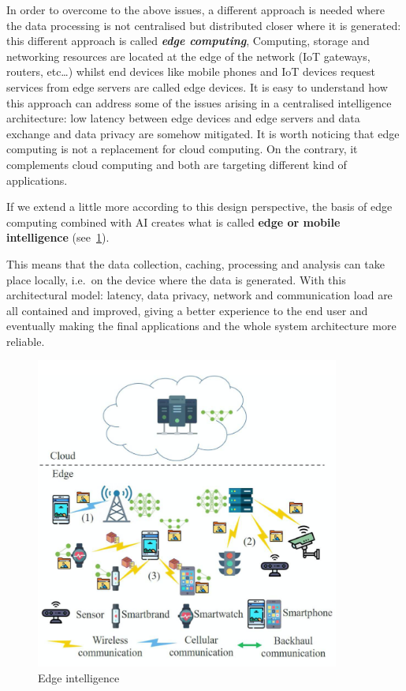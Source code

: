 In order to overcome to the above issues, a different approach is needed where
the data processing is not centralised but distributed closer where it is
generated: this different approach is called \textbf{\textit{edge computing}},
Computing, storage and networking resources are located at the edge of the
network (IoT gateways, routers, etc\ldots) whilst end devices like mobile
phones and IoT devices request services from edge servers are called edge
devices.
It is easy to understand how this approach can address some of the issues
arising in a centralised intelligence architecture: low latency between edge
devices and edge servers and data exchange and data privacy are somehow
mitigated.
It is worth noticing that edge computing is not a replacement for cloud
computing. On the contrary, it complements cloud computing and both are
targeting different kind of applications.

If we extend a little more according to this design perspective, the basis of
edge computing combined with AI creates what is called
\textbf{edge or mobile intelligence} (see~\ref{fig:edge_intelligence}).

This means that the data collection, caching, processing and analysis can take
place locally, i.e.\ on the device where the data is generated.
With this architectural model: latency, data privacy, network and communication
load are all contained and improved, giving a better experience to the end user
and eventually making the final applications and the whole system architecture
more reliable.

\begin{figure}[ht]
    \includegraphics[width=10cm]{images/introduction/edge_intelligence.png}
    \centering
    \caption{Edge intelligence}\label{fig:edge_intelligence}
\end{figure}

